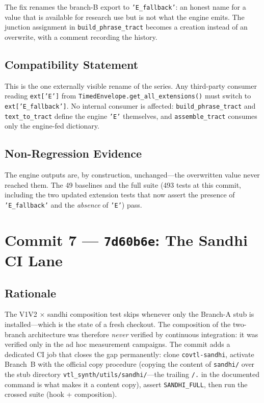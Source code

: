 \documentclass[11pt,a4paper]{article}
\newcommand{\code}[1]{\texttt{#1}}
\newcommand{\commit}[1]{\texttt{#1}}
\newcommand{\pkg}[1]{\texttt{#1}}
\begin{document}
The fix renames the branch-B export to \code{'E\_fallback'}: an
honest name for a value that is available for research use but is
not what the engine emits. The junction assignment in
\code{build\_phrase\_tract} becomes a creation instead of an
overwrite, with a comment recording the history.

\subsection{Compatibility Statement}

This is the one externally visible rename of the series. Any
third-party consumer reading \code{ext['E']} from
\code{TimedEnvelope.get\_all\_extensions()} must switch to
\code{ext['E\_fallback']}. No internal consumer is affected:
\code{build\_phrase\_tract} and \code{text\_to\_tract} define the
engine \code{'E'} themselves, and \code{assemble\_tract} consumes
only the engine-fed dictionary.

\subsection{Non-Regression Evidence}

The engine outputs are, by construction, unchanged---the overwritten
value never reached them. The 49 baselines and the full suite (493
tests at this commit, including the two updated extension tests that
now assert the presence of \code{'E\_fallback'} and the
\emph{absence} of \code{'E'}) pass.

\section{Commit 7 --- \commit{7d60b6e}: The Sandhi CI Lane}
\label{sec:c7}

\subsection{Rationale}

The V1V2 $\times$ sandhi composition test skips whenever only the
Branch-A stub is installed---which is the state of a fresh checkout.
The composition of the two-branch architecture was therefore
\emph{never} verified by continuous integration: it was verified
only in the ad hoc measurement campaigns. The commit adds a dedicated
CI job that closes the gap permanently: clone \pkg{covtl-sandhi},
activate Branch~B with the official copy procedure (copying the
content of \code{sandhi/} over the stub directory
\code{vtl\_synth/utils/sandhi/}---the trailing \code{/.} in the
documented command is what makes it a content copy), assert
\code{SANDHI\_FULL}, then run the crossed suite (hook +
composition).
\end{document}
